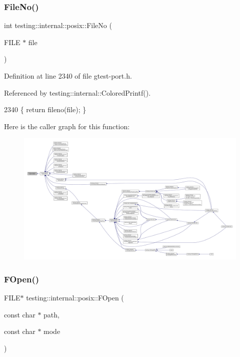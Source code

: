 \subsubsection{\texorpdfstring{File\+No()}{FileNo()}}
{\footnotesize\ttfamily int testing\+::internal\+::posix\+::\+File\+No (\begin{DoxyParamCaption}\item[{F\+I\+LE $\ast$}]{file }\end{DoxyParamCaption})\hspace{0.3cm}{\ttfamily [inline]}}



Definition at line 2340 of file gtest-\/port.\+h.



Referenced by testing\+::internal\+::\+Colored\+Printf().


\begin{DoxyCode}
2340 \{ \textcolor{keywordflow}{return} fileno(file); \}
\end{DoxyCode}
Here is the caller graph for this function\+:
\nopagebreak
\begin{figure}[H]
\begin{center}
\leavevmode
\includegraphics[width=350pt]{namespacetesting_1_1internal_1_1posix_a3117b067e1f942a2031e666953120ccc_icgraph}
\end{center}
\end{figure}
\mbox{\label{namespacetesting_1_1internal_1_1posix_a4042201dcc4932641d484e7ddf94de7d}} 
\subsubsection{\texorpdfstring{F\+Open()}{FOpen()}}
{\footnotesize\ttfamily F\+I\+LE$\ast$ testing\+::internal\+::posix\+::\+F\+Open (\begin{DoxyParamCaption}\item[{const char $\ast$}]{path,  }\item[{const char $\ast$}]{mode }\end{DoxyParamCaption})\hspace{0.3cm}{\ttfamily [inline]}}




